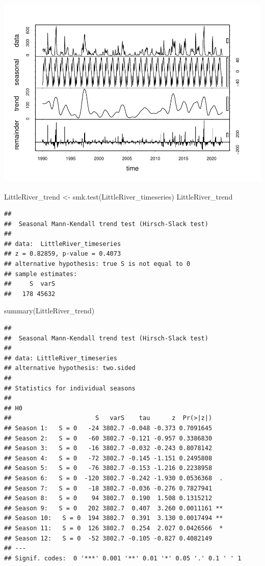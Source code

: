 \documentclass[
  12pt,
]{article}
\newenvironment{Shaded}{\begin{snugshade}}{\end{snugshade}}
\newcommand{\FunctionTok}[1]{\textcolor[rgb]{0.00,0.00,0.00}{#1}}
\newcommand{\NormalTok}[1]{#1}
\newcommand{\OtherTok}[1]{\textcolor[rgb]{0.56,0.35,0.01}{#1}}
\begin{document}
\includegraphics{Project_files/figure-latex/time-series analysis on Regular Water Resources-3.pdf}

\begin{Shaded}
\begin{Highlighting}[]
\NormalTok{LittleRiver\_trend }\OtherTok{\textless{}{-}} \FunctionTok{smk.test}\NormalTok{(LittleRiver\_timeseries)}
\NormalTok{LittleRiver\_trend}
\end{Highlighting}
\end{Shaded}

\begin{verbatim}
## 
##  Seasonal Mann-Kendall trend test (Hirsch-Slack test)
## 
## data:  LittleRiver_timeseries
## z = 0.82859, p-value = 0.4073
## alternative hypothesis: true S is not equal to 0
## sample estimates:
##     S  varS 
##   178 45632
\end{verbatim}

\begin{Shaded}
\begin{Highlighting}[]
\FunctionTok{summary}\NormalTok{(LittleRiver\_trend)}
\end{Highlighting}
\end{Shaded}

\begin{verbatim}
## 
##  Seasonal Mann-Kendall trend test (Hirsch-Slack test)
## 
## data: LittleRiver_timeseries
## alternative hypothesis: two.sided
## 
## Statistics for individual seasons
## 
## H0
##                       S   varS    tau      z  Pr(>|z|)   
## Season 1:   S = 0   -24 3802.7 -0.048 -0.373 0.7091645   
## Season 2:   S = 0   -60 3802.7 -0.121 -0.957 0.3386830   
## Season 3:   S = 0   -16 3802.7 -0.032 -0.243 0.8078142   
## Season 4:   S = 0   -72 3802.7 -0.145 -1.151 0.2495808   
## Season 5:   S = 0   -76 3802.7 -0.153 -1.216 0.2238958   
## Season 6:   S = 0  -120 3802.7 -0.242 -1.930 0.0536368  .
## Season 7:   S = 0   -18 3802.7 -0.036 -0.276 0.7827941   
## Season 8:   S = 0    94 3802.7  0.190  1.508 0.1315212   
## Season 9:   S = 0   202 3802.7  0.407  3.260 0.0011161 **
## Season 10:   S = 0  194 3802.7  0.391  3.130 0.0017494 **
## Season 11:   S = 0  126 3802.7  0.254  2.027 0.0426566  *
## Season 12:   S = 0  -52 3802.7 -0.105 -0.827 0.4082149   
## ---
## Signif. codes:  0 '***' 0.001 '**' 0.01 '*' 0.05 '.' 0.1 ' ' 1
\end{verbatim}
\end{document}
